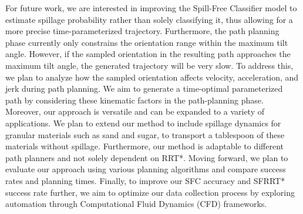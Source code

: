 For future work, we are interested in improving the Spill-Free Classifier model to estimate spillage probability rather than solely classifying it, thus allowing for a more precise time-parameterized trajectory. Furthermore, the path planning phase currently only constrains the orientation range within the maximum tilt angle. However, if the sampled orientation in the resulting path approaches the maximum tilt angle, the generated trajectory will be very slow. To address this, we plan to analyze how the sampled orientation affects velocity, acceleration, and jerk during path planning. We aim to generate a time-optimal parameterized path by considering these kinematic factors in the path-planning phase.
Moreover, our approach is versatile and can be expanded to a variety of applications. We plan to extend our method to include spillage dynamics for granular materials such as sand and sugar, to transport a tablespoon of these materials without spillage.
Furthermore, our method is adaptable to different path planners and not solely dependent on RRT*. Moving forward, we plan to evaluate our approach using various planning algorithms and compare success rates and planning times.
Finally, to improve our SFC accuracy and SFRRT* success rate further, we aim to optimize our data collection process by exploring automation through Computational Fluid Dynamics (CFD) frameworks. 
